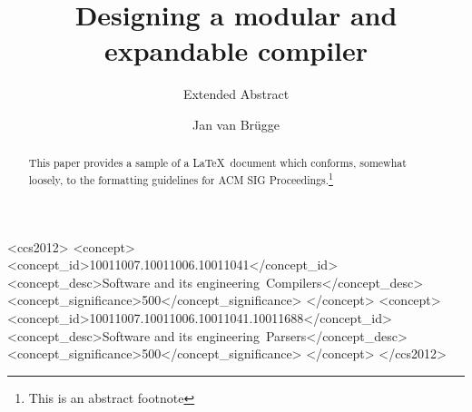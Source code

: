 \documentclass[sigconf, authorversion]{acmart}
\begin{document}
\title{Designing a modular and expandable compiler}
\subtitle{Extended Abstract}

\author{Jan van Br\"ugge}

\begin{abstract}
This paper provides a sample of a \LaTeX\ document which conforms,
somewhat loosely, to the formatting guidelines for
ACM SIG Proceedings.\footnote{This is an abstract footnote}
\end{abstract}

%
%
\begin{CCSXML}
<ccs2012>
<concept>
<concept_id>10011007.10011006.10011041</concept_id>
<concept_desc>Software and its engineering~Compilers</concept_desc>
<concept_significance>500</concept_significance>
</concept>
<concept>
<concept_id>10011007.10011006.10011041.10011688</concept_id>
<concept_desc>Software and its engineering~Parsers</concept_desc>
<concept_significance>500</concept_significance>
</concept>
</ccs2012>
\end{CCSXML}





\maketitle




 
\end{document}
